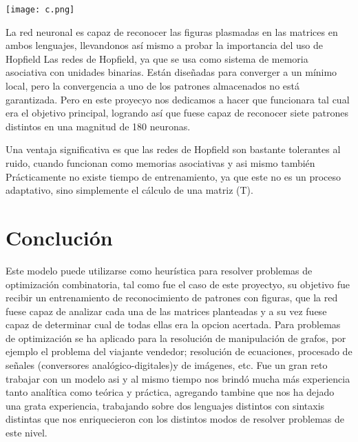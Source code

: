\documentclass{report}
\begin{document}
{\texttt{[image: c.png]}

\newline
La red neuronal es capaz de reconocer las figuras plasmadas en las matrices en ambos lenguajes, llevandonos así mismo a probar la importancia del uso de Hopfield Las redes de Hopfield, ya que se usa como sistema de memoria asociativa con unidades binarias. Están diseñadas para converger a un mínimo local, pero la convergencia a uno de los patrones almacenados no está garantizada. Pero en este proyecyo nos dedicamos a hacer que funcionara tal cual era el objetivo principal, logrando así que fuese capaz de reconocer siete patrones distintos en una magnitud de 180 neuronas.

Una ventaja significativa es que las redes de Hopfield son bastante tolerantes al ruido, cuando funcionan como memorias asociativas y asi mismo también Prácticamente no existe tiempo de entrenamiento, ya que este no es un proceso adaptativo, sino simplemente el cálculo de una matriz (T).}


\newline
\section{ Concluci\'on}
 
{\large Este modelo puede utilizarse como heurística para resolver problemas de optimización combinatoria, tal como fue el caso de este proyectyo, su objetivo fue recibir un entrenamiento de reconocimiento de patrones con figuras, que la red fuese capaz de analizar cada una de las matrices planteadas y a su vez fuese capaz de determinar cual de todas ellas era la opcion acertada. Para problemas de optimización se ha aplicado para la resolución de manipulación de grafos, por ejemplo el problema del viajante vendedor; resolución de ecuaciones, procesado de señales (conversores analógico-digitales)y de imágenes, etc.
Fue un gran reto trabajar con un modelo asi y al mismo tiempo nos brindó mucha más experiencia tanto analítica como teórica y práctica, agregando tambine que nos ha dejado una grata experiencia, trabajando sobre dos lenguajes distintos con sintaxis distintas que nos enriquecieron con los distintos modos de resolver problemas de este nivel.}
\end{document}

